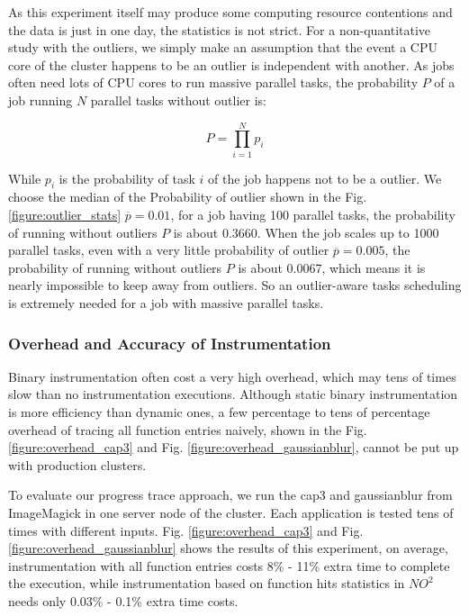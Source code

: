 As this experiment itself may produce some computing resource contentions and the data is just in one day, the statistics is not strict. For a non-quantitative study with the outliers, we simply make an assumption that the event a CPU core of the cluster happens to be an outlier is independent with another. As jobs often need lots of CPU cores to run massive parallel tasks, the probability $P$ of a job running $N$ parallel tasks without outlier is:

$$P = \prod_{i=1}^N p_i$$

While $p_i$ is the probability of task $i$ of the job happens not to be a outlier. We choose the median of the Probability of outlier shown in the Fig. \ref{figure:outlier_stats} $\overline{p} = 0.01$, for a job having 100 parallel tasks, the probability of running without outliers $P$ is about 0.3660. When the job scales up to 1000 parallel tasks, even with a very little probability of outlier $\overline{p} = 0.005$, the probability of running without outliers $P$ is about 0.0067, which means it is nearly impossible to keep away from outliers. So an outlier-aware tasks scheduling is extremely needed for a job with massive parallel tasks.

\subsubsection{Overhead and Accuracy of Instrumentation}

Binary instrumentation often cost a very high overhead, which may tens of times slow than no instrumentation executions. Although static binary instrumentation is more efficiency than dynamic ones, a few percentage to tens of percentage overhead of tracing all function entries naively, shown in the Fig. \ref{figure:overhead_cap3} and Fig. \ref{figure:overhead_gaussianblur}, cannot be put up with production clusters.

To evaluate our progress trace approach, we run the cap3 and gaussianblur from ImageMagick in one server node of the cluster. Each application is tested tens of times with different inputs. Fig. \ref{figure:overhead_cap3} and Fig. \ref{figure:overhead_gaussianblur} shows the results of this experiment, on average, instrumentation with all function entries costs 8\% - 11\% extra time to complete the execution, while instrumentation based on function hits statistics in $NO^2$ needs only 0.03\% - 0.1\% extra time costs.

